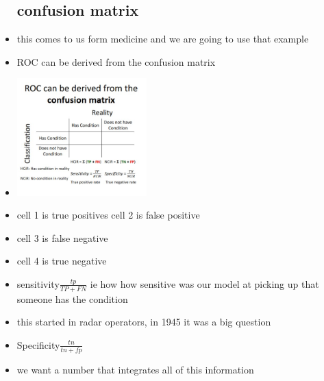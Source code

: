 \documentclass{article}
\begin{document}
\begin{itemize}
\subsection{confusion matrix}
\item this comes to us form medicine and we are going to use that example
\item ROC can be derived from the confusion matrix 
\item \includegraphics[width=5cm]{Final_Review/lecture_10/confusion_matix_class.jpg}
\item cell 1 is true positives 
\itme cell 2 is false positive 
\item cell 3 is false negative 
\item cell 4 is true negative
\item sensitivity$\frac{tp}{TP+FN}$ ie how how sensitive was our model at picking up that someone has the condition 
\item this started in radar operators, in 1945 it was a big question
\item Specificity$\frac{tn}{tn+fp}$
\item we want a number that integrates all of this information 

\end{itemize}
\end{document}
